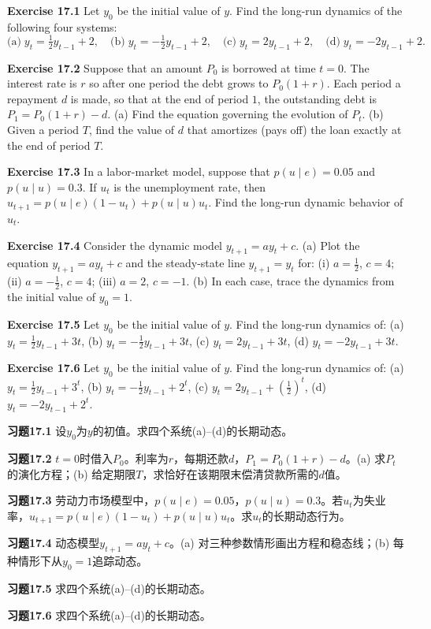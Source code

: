 \begin{original}
\textbf{Exercise 17.1} Let $y_0$ be the initial value of $y$. Find the long-run dynamics of the following four systems:
\[
\text{(a)}\; y_t = \tfrac{1}{2}y_{t-1} + 2,\quad
\text{(b)}\; y_t = -\tfrac{1}{2}y_{t-1} + 2,\quad
\text{(c)}\; y_t = 2y_{t-1} + 2,\quad
\text{(d)}\; y_t = -2y_{t-1} + 2.
\]

\textbf{Exercise 17.2} Suppose that an amount $P_0$ is borrowed at time $t = 0$. The interest rate is $r$ so after one period the debt grows to $P_0(1 + r)$. Each period a repayment $d$ is made, so that at the end of period $1$, the outstanding debt is $P_1 = P_0(1 + r) - d$.
(a) Find the equation governing the evolution of $P_t$.
(b) Given a period $T$, find the value of $d$ that amortizes (pays off) the loan exactly at the end of period $T$.

\textbf{Exercise 17.3} In a labor-market model, suppose that $p(u \mid e) = 0.05$ and $p(u \mid u) = 0.3$. If $u_t$ is the unemployment rate, then $u_{t+1} = p(u \mid e)(1 - u_t) + p(u \mid u)u_t$. Find the long-run dynamic behavior of $u_t$.

\textbf{Exercise 17.4} Consider the dynamic model $y_{t+1} = a y_t + c$.
(a) Plot the equation $y_{t+1} = a y_t + c$ and the steady-state line $y_{t+1} = y_t$ for: (i) $a = \frac{1}{2}$, $c = 4$; (ii) $a = -\frac{1}{2}$, $c = 4$; (iii) $a = 2$, $c = -1$.
(b) In each case, trace the dynamics from the initial value of $y_0 = 1$.

\textbf{Exercise 17.5} Let $y_0$ be the initial value of $y$. Find the long-run dynamics of: (a) $y_t = \frac{1}{2}y_{t-1} + 3t$, (b) $y_t = -\frac{1}{2}y_{t-1} + 3t$, (c) $y_t = 2y_{t-1} + 3t$, (d) $y_t = -2y_{t-1} + 3t$.

\textbf{Exercise 17.6} Let $y_0$ be the initial value of $y$. Find the long-run dynamics of: (a) $y_t = \frac{1}{2}y_{t-1} + 3^t$, (b) $y_t = -\frac{1}{2}y_{t-1} + 2^t$, (c) $y_t = 2y_{t-1} + (\frac{1}{2})^t$, (d) $y_t = -2y_{t-1} + 2^t$.
\end{original}
\begin{translation}
\textbf{习题17.1} 设$y_0$为$y$的初值。求四个系统(a)--(d)的长期动态。

\textbf{习题17.2} $t = 0$时借入$P_0$。利率为$r$，每期还款$d$，$P_1 = P_0(1+r) - d$。(a) 求$P_t$的演化方程；(b) 给定期限$T$，求恰好在该期限末偿清贷款所需的$d$值。

\textbf{习题17.3} 劳动力市场模型中，$p(u \mid e) = 0.05$，$p(u \mid u) = 0.3$。若$u_t$为失业率，$u_{t+1} = p(u \mid e)(1 - u_t) + p(u \mid u)u_t$。求$u_t$的长期动态行为。

\textbf{习题17.4} 动态模型$y_{t+1} = a y_t + c$。(a) 对三种参数情形画出方程和稳态线；(b) 每种情形下从$y_0 = 1$追踪动态。

\textbf{习题17.5} 求四个系统(a)--(d)的长期动态。

\textbf{习题17.6} 求四个系统(a)--(d)的长期动态。
\end{translation}

